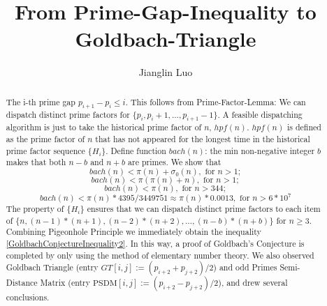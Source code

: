 \documentclass[12pt,a4paper,reqno]{amsart}
\numberwithin{equation}{section}
\theoremstyle{plain}
\theoremstyle{definition}
\begin{document}
	
	\title{From Prime-Gap-Inequality to Goldbach-Triangle}
	
	\author{Jianglin Luo}
	\address{WangYueHu Community 1-pian 7-dong, Changsha, China 230026.}
	
	
	
	\begin{abstract}
		The i-th prime gap $p_{i+1}-p_{i}\leq i$. This follows from 
		Prime-Factor-Lemma: We can dispatch distinct prime factors for 
		$\{p_i,p_i+1,\dots,p_{i+1}-1\}$. A feasible dispatching algorithm 
		is just to take the historical prime factor of $n$, $hpf(n)$. 
		$hpf(n)$ is defined as the prime factor of $n$ that has not appeared for the 
		longest time in the historical prime factor sequence $\{H_i\}$. 
		Define function $bach(n)$: the min non-negative integer $b$ makes 
		that both $n-b$ and $n+b$ are primes. We show that 
	\begin{equation}\label{GoldbachConjectureInequality1}
		bach(n) < \pi(n)+\sigma_0(n) ,\text{ for } n>1;
	\end{equation}
	\begin{equation}\label{GoldbachConjectureInequality2}
		bach(n) < \pi(\pi(n)+n) ,\text{ for }  n>1;
	\end{equation}
	\begin{equation}\label{GoldbachConjectureInequality3}
		bach(n) < \pi(n), \text{ for } n>344; 
	\end{equation}
	\begin{equation}\label{GCInequality4}
		bach(n) < \pi(n)*4395/3449751\approx\pi(n)*0.0013,\text{ for } n>6*10^7
	\end{equation}
	The property of $\{H_i\}$ ensures that we can dispatch distinct prime 
	factors to each item of  
	$\{n,(n-1)*(n+1),(n-2)*(n+2),\dots,(n-b)*(n+b)\}$ for $n \geq 3$. 
	Combining Pigeonhole Principle we immediately obtain 
	the inequality \eqref{GoldbachConjectureInequality2}. In this way, 
	a proof of Goldbach's Conjecture is completed by only using the method 
	of elementary number theory. We also observed Goldbach Triangle 
	(entry $GT[i,j]:=(p_{i+2}+p_{j+2})/2$) and odd Primes Semi-Distance Matrix
	(entry $\text{PSDM}[i,j]:=(p_{i+2}-p_{j+2})/2$), and drew several conclusions.
	
	\end{abstract}
	
	\maketitle
	
\end{document}
